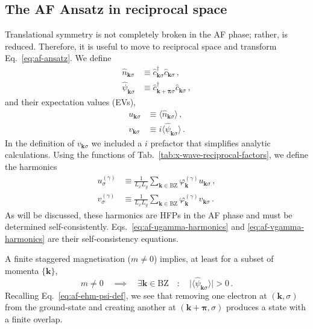 \subsection{The AF Ansatz in reciprocal space}\label{subsec:af-ansatz-reciprocal}

Translational symmetry is not completely broken in the AF phase; rather, is reduced. Therefore, it is useful to move to reciprocal space and transform Eq.~\eqref{eq:af-ansatz}. We define
\begin{align}
	\hat n_{\mathbf{k}\sigma} &\equiv \hat c_{\mathbf{k}\sigma}^\dagger \hat c_{\mathbf{k}\sigma} \, , \label{eq:af-ehm-n-def} \\
	\hat \psi_{\mathbf{k}\sigma} &\equiv \hat c_{\mathbf{k}+\bm{\pi}\sigma}^\dagger \hat c_{\mathbf{k}\sigma} \, , \label{eq:af-ehm-psi-def}
\end{align}
and their expectation values (EVs),
\begin{align}
	u_{\mathbf{k}\sigma} &\equiv \langle
	\hat n_{\mathbf{k}\sigma}
	\rangle \, , \label{eq:af-uqsigma-def} \\
	v_{\mathbf{k}\sigma} &\equiv i \langle
	\hat \psi_{\mathbf{k}\sigma}
	\rangle \, . \label{eq:af-vqsigma-def}
\end{align}
In the definition of $v_{\mathbf{k}\sigma}$ we included a $i$ prefactor that simplifies analytic calculations. Using the functions of Tab.~\ref{tab:x-wave-reciprocal-factors}, we define the harmonics
\begin{align}
	u^{(\gamma)}_\sigma &\equiv \frac{1}{L_x L_y} \sum_{\mathbf{k}\in\mathrm{BZ}} \varphi_\mathbf{k}^{(\gamma)} u_{\mathbf{k}\sigma} \, , \label{eq:af-ugamma-harmonics} \\
	v^{(\gamma)}_\sigma &\equiv \frac{1}{L_x L_y} \sum_{\mathbf{k}\in\mathrm{BZ}} \varphi_\mathbf{k}^{(\gamma)} v_{\mathbf{k}\sigma} \, . \label{eq:af-vgamma-harmonics}
\end{align}
As will be discussed, these harmonics are HFPs in the AF phase and must be determined self-consistently. Eqs.~\eqref{eq:af-ugamma-harmonics} and \eqref{eq:af-vgamma-harmonics} are their self-consistency equations.

A finite staggered magnetisation ($m \neq 0$) implies, at least for a subset of momenta $\lbrace \mathbf{k} \rbrace$,
\begin{equation}\label{eq:af-psi>0}
	m \neq 0
	\quad\implies\quad
	\exists \mathbf{k} \in \mathrm{BZ}
	\quad\colon\quad
	\big| \langle \hat \psi_{\mathbf{k}\sigma} \rangle  \big| > 0 \, .
\end{equation}
Recalling Eq.~\eqref{eq:af-ehm-psi-def}, we see that removing one electron at $(\mathbf{k},\sigma)$ from the ground-state and creating another at $(\mathbf{k}+\bm{\pi},\sigma)$ produces a state with a finite overlap.

